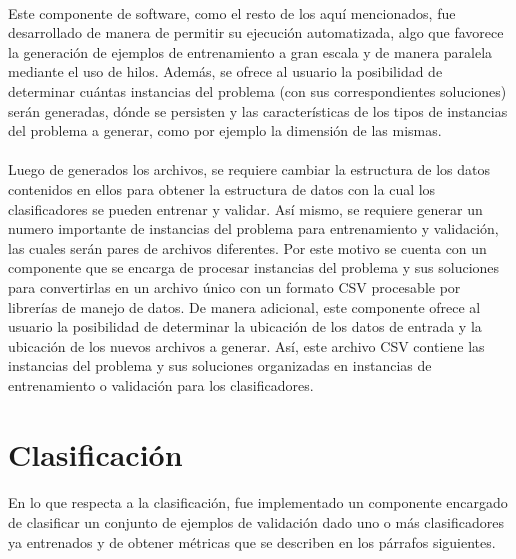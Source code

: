 \paragraph{} Este componente de software, como el resto de los aquí mencionados, fue desarrollado de manera de permitir su ejecución automatizada, algo que favorece la generación de ejemplos de entrenamiento a gran escala y de manera paralela mediante el uso de hilos. Además, se ofrece al usuario la posibilidad de determinar cuántas instancias del problema (con sus correspondientes soluciones) serán generadas, dónde se persisten y las características de los tipos de instancias del problema a generar, como por ejemplo la dimensión de las mismas.

\paragraph{} Luego de generados los archivos, se requiere cambiar la estructura de los datos contenidos en ellos para obtener la estructura de datos con la cual los clasificadores se pueden entrenar y validar. Así mismo, se requiere generar un numero importante de instancias del problema para entrenamiento y validación, las cuales serán pares de archivos diferentes. Por este motivo se cuenta con un componente que se encarga de procesar instancias del problema y sus soluciones para convertirlas en un archivo único con un formato CSV procesable por librerías de manejo de datos. De manera adicional, este componente ofrece al usuario la posibilidad de determinar la ubicación de los datos de entrada y la ubicación de los nuevos archivos a generar. Así, este archivo CSV contiene las instancias del problema y sus soluciones organizadas en instancias de entrenamiento o validación para los clasificadores.




\section{Clasificación}

\paragraph{} En lo que respecta a la clasificación, fue implementado un componente encargado de clasificar un conjunto de ejemplos de validación dado uno o más clasificadores ya entrenados y de obtener métricas que se describen en los párrafos siguientes.

